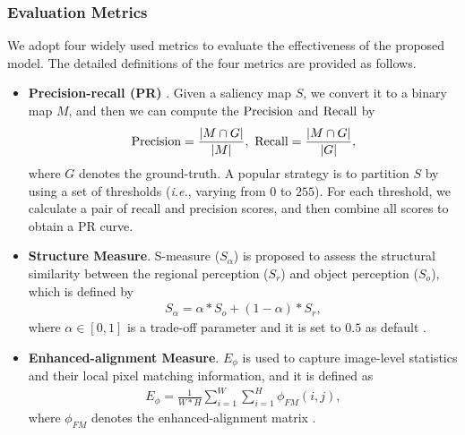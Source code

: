 \documentclass[10pt,twocolumn,letterpaper]{article}
\def\ie{\emph{i.e.}}
\begin{document}
\subsubsection{Evaluation Metrics}
\label{metrics}

We adopt four widely used metrics to evaluate the effectiveness of the proposed model. The detailed definitions of the four metrics are provided as follows.
\begin{itemize}{\setlength{\parsep}{-0.25ex}}

\item {\textbf{Precision-recall (PR)}} \cite{achanta2009frequency}. Given a saliency map $S$, we convert it to a binary map $M$, and then we can compute the $\textup{Precision}$
and $\textup{Recall}$ by
\begin{equation}
\textup{Precision}=\frac{|M\cap{G}|}{|M|},~ \textup{Recall}=\frac{|M\cap{G}|}{|G|},
\end{equation}
where $G$ denotes the ground-truth. A popular strategy is to partition $S$ by using a set of thresholds (\ie, varying from $0$ to $255$). For each threshold, we calculate a pair of recall and precision scores, and then combine all scores to obtain a PR curve.


\item \textbf{Structure Measure}. {S-measure} ($S_{\alpha}$) \cite{fan2017structure} is proposed to assess the structural similarity between the regional perception ($S_r$) and object perception ($S_o$), which is defined by
\begin{equation}
\begin{aligned}
S_{\alpha}=\alpha * S_{o}+\left(1-\alpha\right)*S_{r},
\end{aligned}
\end{equation}
where $ \alpha \in \left[ 0,1\right]$ is a trade-off parameter and it is set to $0.5$ as default \cite{fan2017structure}.

\item \textbf{Enhanced-alignment Measure}. $E_{\phi}$ \cite{Fan2018Enhanced} is used to capture image-level statistics and their local pixel matching information, and it is defined as
\begin{equation}
\begin{aligned}
E_{\phi}=\frac{1}{W*H}\sum_{i=1}^{W}\sum_{i=1}^{H}\phi_{FM}\left(i,j\right),
\end{aligned}
\end{equation}
where $ \phi_{FM} $ denotes the enhanced-alignment matrix \cite{Fan2018Enhanced}.


\end{itemize}
\end{document}
